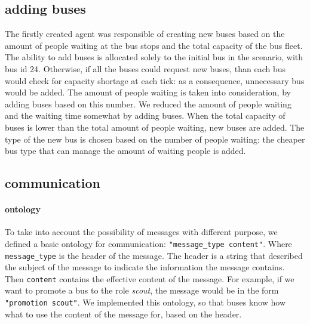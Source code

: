 \documentclass{article}
\begin{document}
\subsection{adding buses}
The firstly created agent was responsible of creating new buses based on the amount of people waiting at the bus stops and the total capacity of the bus fleet. The ability to add buses is allocated solely to the initial bus in the scenario, with bus id 24. Otherwise, if all the buses could request new buses, than each bus would check for capacity shortage at each tick: as a consequence, unnecessary bus would be added. 
\newline
The amount of people waiting is taken into consideration, by adding buses based on this number. We reduced the amount of people waiting and the waiting time somewhat by adding buses. When the total capacity of buses is lower than the total amount of people waiting, new buses are added. The type of the new bus is chosen based on the number of people waiting: the cheaper bus type that can manage the amount of waiting people is added.

\subsection{communication}
\paragraph{ontology}
To take into account the possibility of messages with different purpose, we defined a basic ontology for communication: \texttt{"message\_type content"}. Where  \texttt{message\_type} is the header of the message. The header is a string that described the subject of the message to indicate the information the message contains. Then \texttt{content} contains the effective content of the message. For example, if we want to promote a bus to the role \textit{scout}, the message would be in the form \texttt{"promotion scout"}. We implemented this ontology, so that buses know how what to use the content of the message for, based on the header. 
\end{document}
